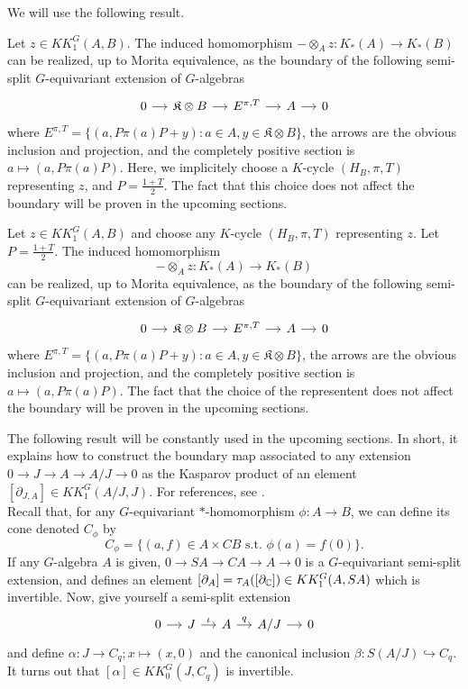 We will use the following result.\cite{blackadar}\cite{CuSk}

\begin{prop}
Let $z\in KK^G_1(A,B)$. The induced homomorphism $-\otimes_A z : K_*(A)\rightarrow K_*(B)$ can be realized, up to Morita equivalence, as the boundary of the following semi-split $G$-equivariant extension of $G$-algebras
\[\begin{tikzcd}[column sep = small] 
0 \arrow{r}& \mathfrak K \otimes B \arrow{r} & E^{\pi,T} \arrow{r} & A \arrow{r} & 0\end{tikzcd}\]
where $E^{\pi,T}=\{(a,P\pi(a)P +y) : a\in A , y\in \mathfrak K \otimes B\}$, the arrows are the obvious inclusion and projection, and the completely positive section is $a\mapsto (a, P \pi(a) P)$. Here, we implicitely choose a $K$-cycle $(H_B,\pi,T)$ representing $z$, and $P=\frac{1+T}{2}$. The fact that this choice does not affect the boundary will be proven in the upcoming sections. 
\end{prop}

\begin{prop}
Let $z\in KK^G_1(A,B)$ and choose any $K$-cycle $(H_B,\pi,T)$ representing $z$. Let $P=\frac{1+T}{2}$. The induced homomorphism 
\[-\otimes_A z : K_*(A)\rightarrow K_*(B)\]
can be realized, up to Morita equivalence, as the boundary of the following semi-split $G$-equivariant extension of $G$-algebras
\[\begin{tikzcd}[column sep = small] 
0 \arrow{r}& \mathfrak K \otimes B \arrow{r} & E^{\pi,T} \arrow{r} & A \arrow{r} & 0\end{tikzcd}\]
where $E^{\pi,T}=\{(a,P\pi(a)P +y) : a\in A , y\in \mathfrak K \otimes B\}$, the arrows are the obvious inclusion and projection, and the completely positive section is $a\mapsto (a, P \pi(a) P)$. The fact that the choice of the representent does not affect the boundary will be proven in the upcoming sections. 
\end{prop}

The following result will be constantly used in the upcoming sections. In short, it explains how to construct the boundary map associated to any extension $0\rightarrow J\rightarrow A \rightarrow A/J \rightarrow 0$ as the Kasparov product of an element $[\partial_{J,A}]\in KK^G_1(A/J,J)$. For references, see \cite{blackadar}.\\

Recall that, for any $G$-equivariant $*$-homomorphism $\phi : A \rightarrow B$, we can define its cone denoted $C_\phi$ by 
\[C_\phi = \{(a,f)\in A\times CB \text{ s.t. } \phi(a)=f(0)\}.\]
If any $G$-algebra $A$ is given, $0\rightarrow SA\rightarrow CA\rightarrow A \rightarrow 0$ is a $G$-equivariant semi-split extension, and defines an element $[\partial_A]=\tau_A([\partial_\mathbb C])\in KK^G_1(A,SA)$ which is invertible. Now, give yourself a semi-split extension 
\[\begin{tikzcd}[column sep = small]0 \arrow{r} & J \arrow{r}{\iota} & A \arrow{r}{q} & A/J \arrow{r}& 0 \end{tikzcd}\] 
and define $\alpha : J\rightarrow C_q ; x\mapsto (x,0)$ and the canonical inclusion $\beta : S (A/J)\hookrightarrow C_q$. It turns out that $[\alpha]\in KK_0^G(J,C_q)$ is invertible.

